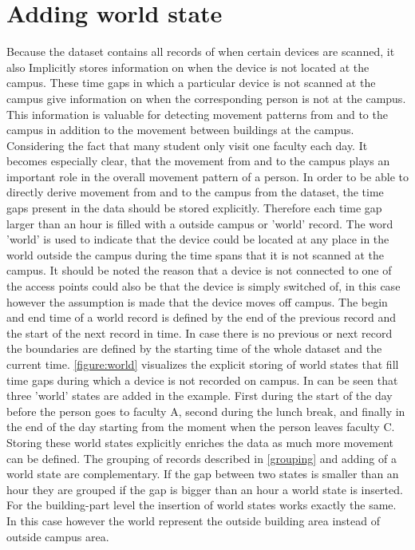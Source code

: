 \section{Adding world state}\label{Adding world}
Because the dataset contains all records of when certain devices are scanned, it also Implicitly stores information on when the device is not located at the campus. These time gaps in which a particular device is not scanned at the campus give information on when the corresponding person is not at the campus. This information is valuable for detecting movement patterns from and to the campus in addition to the movement between buildings at the campus. Considering the fact that many student only visit one faculty each day. It becomes especially clear, that the movement from and to the campus plays an important role in the overall movement pattern of a person. In order to be able to directly derive movement from and to the campus from the dataset, the time gaps present in the data should be stored explicitly. Therefore each time gap larger than an hour is filled with a outside campus or 'world' record. The word 'world' is used to indicate that the device could be located at any place in the world outside the campus during the time spans that it is not scanned at the campus. It should be noted the reason that a device is not connected to one of the access points could also be that the device is simply switched of, in this case however the assumption is made that the device moves off campus. The begin and end time of a world record is defined by the end of the previous record and the start of the next record in time. In case there is no previous or next record the boundaries are defined by the starting time of the whole dataset and the current time. \autoref{figure:world} visualizes the explicit storing of world states that fill time gaps during which a device is not recorded on campus. In can be seen that three 'world' states are added in the example. First during the start of the day before the person goes to faculty A, second during the lunch break, and finally in the end of the day starting from the moment when the person leaves faculty C. Storing these world states explicitly enriches the data as much more movement can be defined. The grouping of records described in \autoref{grouping} and adding of a world state are complementary. If the gap between two states is smaller than an hour they are grouped if the gap is bigger than an hour a world state is inserted. For the building-part level the insertion of world states works exactly the same. In this case however the world represent the outside building area instead of outside campus area.

